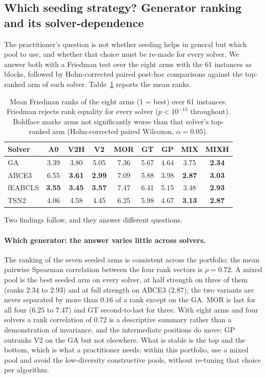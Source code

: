 \documentclass[review]{elsarticle}
\begin{document}
\subsection{Which seeding strategy? Generator ranking and its
solver-dependence}\label{sec:res-ranking}

The practitioner's question is not whether seeding helps in general but
which pool to use, and whether that choice must be re-made for every
solver. We answer both with a Friedman test over the eight arms with the 61
instances as blocks, followed by Holm-corrected paired post-hoc
comparisons against the top-ranked arm of each solver.
Table~\ref{tab:ranking} reports the mean ranks.

\begin{table}[htbp]
\centering
\caption{Mean Friedman ranks of the eight arms (1 = best) over 61
instances. Friedman rejects rank equality for every solver
($p<10^{-15}$ throughout). Boldface marks arms not significantly worse
than that solver's top-ranked arm (Holm-corrected paired Wilcoxon,
$\alpha=0.05$).}
\label{tab:ranking}
\begin{tabular}{lcccccccc}
\toprule
Solver & A0 & V2H & V2 & MOR & GT & GP & MIX & MIXH \\
\midrule
GA      & 3.39 & 3.80 & 5.05 & 7.36 & 5.67 & 4.64 & 3.75 & \textbf{2.34} \\
ABCE3   & 6.55 & \textbf{3.61} & \textbf{2.99} & 7.09 & 5.88 & 3.98 & \textbf{2.87} & \textbf{3.03} \\
fEABCLS & \textbf{3.55} & \textbf{3.45} & \textbf{3.57} & 7.47 & 6.41 & 5.15 & 3.48 & \textbf{2.93} \\
TSN2    & 4.06 & 4.58 & 4.45 & 6.25 & 5.98 & 4.67 & \textbf{3.13} & \textbf{2.87} \\
\midrule
\bottomrule
\end{tabular}
\end{table}

Two findings follow, and they answer different questions.

\paragraph{Which generator: the answer varies little across solvers.}
The ranking of the seven seeded arms is consistent across the portfolio:
the mean pairwise Spearman correlation between the four rank vectors is
$\rho=0.72$. A mixed pool is the best seeded arm on every solver, at half
strength on three of them (ranks $2.34$ to $2.93$) and at full strength on
ABCE3 ($2.87$); the two variants are never separated by more than
$0.16$ of a rank except on the GA. MOR is last for all four ($6.25$ to
$7.47$) and GT second-to-last for three. With eight arms and four solvers a
rank correlation of $0.72$ is a descriptive summary rather than a
demonstration of invariance, and the intermediate positions do move: GP
outranks V2 on the GA but not elsewhere. What is stable is the top and the
bottom, which is what a practitioner needs: within this portfolio, use a
mixed pool and avoid the low-diversity constructive pools, without
re-tuning that choice per algorithm.
\end{document}
